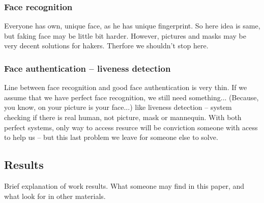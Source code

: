         \subsubsection{Face recognition}
            Everyone has own, unique face, as he has unique fingerprint.
            So here idea is same,
            but faking face may be little bit harder.
            However, pictures and masks may be very decent solutions
            for hakers. %
            Therfore we shouldn't stop here.

        \subsubsection{Face authentication -- liveness detection}
            Line between face recognition and
            good face authentication is very thin.
            If we assume that we have perfect face recognition,
            we still need something... (Because, you know, on your picture is your face...)
            like liveness detection --
            system checking if there is real human, not picture, mask or mannequin.
            With both perfect systems, only way to access resurce will be
            conviction someone with acess to help us -- but this last problem
            we leave for someone else to solve.

    \subsection{Results}
        Brief explanation of work results.
        What someone may find in this paper,
        and what look for in other materials.
